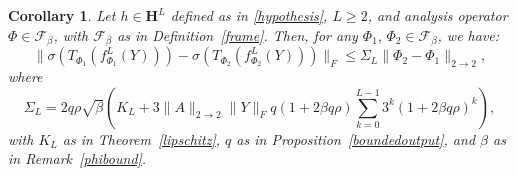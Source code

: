 \documentclass[preprint,12pt]{elsarticle}
\newtheorem{corollary}[theorem]{Corollary}
\newcommand{\opnorm}{2\rightarrow2}
\begin{document}
\begin{corollary}\label{lipdec}
    Let $h\in\mathbf{H}^L$ defined as in \eqref{hypothesis}, $L\geq2$, and analysis operator $\Phi\in\mathcal{F}_{\beta }$, with $\mathcal{F}_{\beta }$ as in Definition~\ref{frame}. Then, for any $\Phi_1,\,\Phi_2\in\mathcal{F}_{\beta }$, we have:
    \begin{equation}
    \|\sigma(T_{\Phi_1}(f^L_{\Phi_1}(Y)))-\sigma(T_{\Phi_2}(f^L_{\Phi_2}(Y)))\|_F\leq\Sigma_L\|\Phi_2-\Phi_1\|_{\opnorm},
\end{equation}
where
\begin{equation}\label{sigmal}
    \Sigma_L=2q\rho\sqrt{\beta}\left(K_L+3\|A\|_{\opnorm}\|Y\|_Fq(1+2\beta q\rho)\sum_{k=0}^{L-1}3^k(1+2\beta q\rho)^k\right),
\end{equation}
with $K_L$ as in Theorem~\ref{lipschitz}, $q$ as in Proposition~\ref{boundedoutput}, and $\beta$ as in Remark~\ref{phibound}.


\end{corollary}
\end{document}
